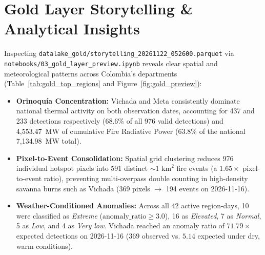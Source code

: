 \documentclass[11pt,letterpaper]{article}
\begin{document}
\section{Gold Layer Storytelling & Analytical Insights}

Inspecting \texttt{datalake\_gold/storytelling\_20261122\_052600.parquet} via \texttt{notebooks/03\_gold\_layer\_preview.ipynb} reveals clear spatial and meteorological patterns across Colombia's departments (Table~\ref{tab:gold_top_regions} and Figure~\ref{fig:gold_preview}):

\begin{itemize}
  \item \textbf{Orinoquía Concentration:} Vichada and Meta consistently dominate national thermal activity on both observation dates, accounting for 437 and 233 detections respectively (68.6\% of all 976 valid detections) and 4,553.47~MW of cumulative Fire Radiative Power (63.8\% of the national 7,134.98~MW total).
  \item \textbf{Pixel-to-Event Consolidation:} Spatial grid clustering reduces 976 individual hotspot pixels into 591 distinct $\sim 1\text{ km}^2$ fire events (a $1.65\times$ pixel-to-event ratio), preventing multi-overpass double counting in high-density savanna burns such as Vichada (369 pixels $\rightarrow$ 194 events on 2026-11-16).
  \item \textbf{Weather-Conditioned Anomalies:} Across all 42 active region-days, 10 were classified as \textit{Extreme} ($\text{anomaly\_ratio} \ge 3.0$), 16 as \textit{Elevated}, 7 as \textit{Normal}, 5 as \textit{Low}, and 4 as \textit{Very low}. Vichada reached an anomaly ratio of $71.79\times$ expected detections on 2026-11-16 ($369$ observed vs. $5.14$ expected under dry, warm conditions).
\end{itemize}
\end{document}
